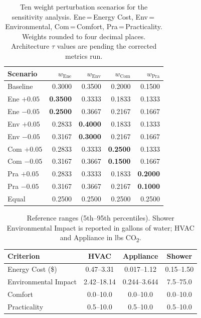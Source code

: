 \documentclass[final,3p,times]{elsarticle}
\begin{document}
\begin{table}[htbp]
\centering
\small
\caption{Ten weight perturbation scenarios for the sensitivity analysis.
         Ene\,=\,Energy Cost, Env\,=\,Environmental, Com\,=\,Comfort,
         Pra\,=\,Practicality. Weights rounded to four decimal places.
         Architecture $\tau$ values are pending the corrected metrics run.}
\label{tab:sensitivity_weights}
\begin{tabular}{@{} l r r r r @{}}
\toprule
\textbf{Scenario} & $w_{\text{Ene}}$ & $w_{\text{Env}}$ & $w_{\text{Com}}$ & $w_{\text{Pra}}$ \\
\midrule
Baseline          & 0.3000 & 0.3500 & 0.2000 & 0.1500 \\
\midrule
Ene $+0.05$       & \textbf{0.3500} & 0.3333 & 0.1833 & 0.1333 \\
Ene $-0.05$       & \textbf{0.2500} & 0.3667 & 0.2167 & 0.1667 \\
\midrule
Env $+0.05$       & 0.2833 & \textbf{0.4000} & 0.1833 & 0.1333 \\
Env $-0.05$       & 0.3167 & \textbf{0.3000} & 0.2167 & 0.1667 \\
\midrule
Com $+0.05$       & 0.2833 & 0.3333 & \textbf{0.2500} & 0.1333 \\
Com $-0.05$       & 0.3167 & 0.3667 & \textbf{0.1500} & 0.1667 \\
\midrule
Pra $+0.05$       & 0.2833 & 0.3333 & 0.1833 & \textbf{0.2000} \\
Pra $-0.05$       & 0.3167 & 0.3667 & 0.2167 & \textbf{0.1000} \\
\midrule
Equal             & 0.2500 & 0.2500 & 0.2500 & 0.2500 \\
\bottomrule
\end{tabular}
\end{table}

\begin{table}[htbp]
\centering
\small
\caption{Reference ranges (5th--95th percentiles). Shower Environmental Impact is reported in gallons of water; HVAC and Appliance in lbs CO\textsubscript{2}.}
\label{table:reference_ranges}
\begin{tabular}{@{}lccc@{}}
\toprule
\textbf{Criterion} & \textbf{HVAC} & \textbf{Appliance} & \textbf{Shower} \\
\midrule
Energy Cost (\$) & 0.47--3.31 & 0.017--1.12 & 0.15--1.50 \\
Environmental Impact & 2.42--18.14 & 0.244--3.644 & 7.5--75.0 \\
Comfort & 0.0--10.0 & 0.0--10.0 & 0.0--10.0 \\
Practicality & 0.5--10.0 & 0.5--10.0 & 0.5--10.0 \\
\bottomrule
\end{tabular}
\end{table}
\end{document}

